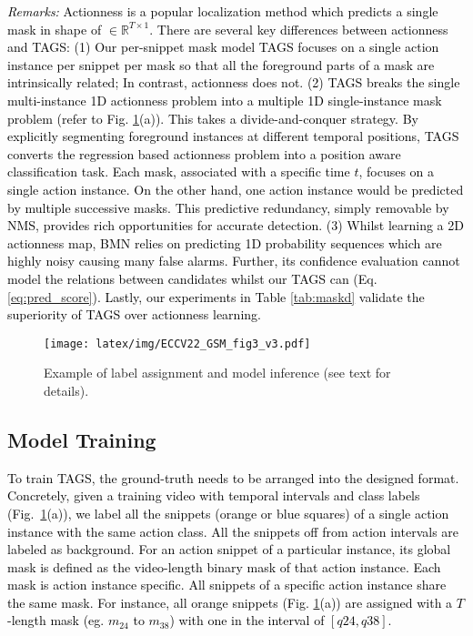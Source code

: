 \documentclass[runningheads]{llncs}
\newcommand{\shortmodelname}{TAGS}
\begin{document}
\noindent\textcolor{black}{\noindent \textit{Remarks: } 
Actionness \cite{lin2019bmn,zhao2017temporal} is 
a popular localization method which predicts a single mask
in shape of $\in \mathbb{R}^{T \times 1}$.
There are several key differences between actionness and {\shortmodelname}: 
(1) Our per-snippet mask model
{\shortmodelname} focuses on a single action instance per snippet per mask
so that all the foreground parts of a mask
are intrinsically related; In contrast, actionness does not.
(2) {\shortmodelname} breaks the single multi-instance 1D actionness problem into a multiple 1D single-instance mask problem (refer to Fig. \ref{fig:label_infer}(a)).
This takes a divide-and-conquer strategy. 
By explicitly segmenting foreground instances at different temporal positions, {\shortmodelname} converts the regression based actionness problem into a position aware classification task. Each mask, associated with a specific time $t$, focuses on a single action instance. 
On the other hand, one action instance would be predicted
by multiple successive masks.
This predictive redundancy, simply removable by NMS,
provides rich opportunities for accurate detection.
(3) Whilst learning a 2D actionness map,
BMN \cite{lin2019bmn} relies on predicting 1D probability sequences which are highly noisy causing many false alarms. Further, its confidence evaluation cannot model the relations between candidates whilst our {\shortmodelname} can (Eq. \eqref{eq:pred_score}).
Lastly, our experiments in Table \ref{tab:maskd} validate the superiority of {\shortmodelname} over actionness learning.
}





 \begin{figure}
\centering
    \texttt{[image: latex/img/ECCV22\_GSM\_fig3\_v3.pdf]}
\caption{Example of label assignment and model inference (see text for details).}
    \label{fig:label_infer}
\end{figure}

\subsection{Model Training}
\textcolor{black}{To train {\shortmodelname}, the ground-truth needs to be arranged into the designed format. Concretely, given a training video with temporal intervals and class labels (Fig.~\ref{fig:label_infer}(a)), we label all the snippets (orange or blue squares) of a single action instance with the same action class. All the snippets off from action intervals
are labeled as background. For an action snippet of a particular instance, its global mask is defined as the video-length
binary mask of that action instance. 
Each mask is action instance specific.
All snippets of a specific action instance share
the same mask. For instance, all orange snippets (Fig. \ref{fig:label_infer}(a)) are assigned with a $T$-length mask (eg. $m_{24}$ to $m_{38}$) with one in the interval of $[q24,q38]$.
}
 
\end{document}
